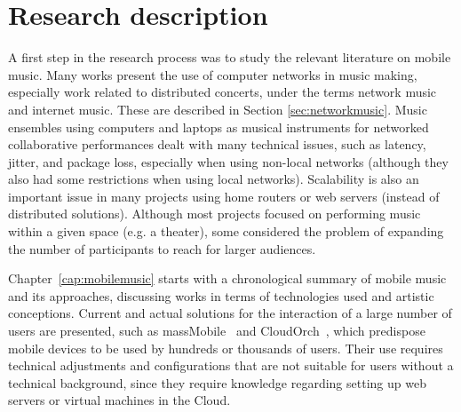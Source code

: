 \section{Research description}

A first step in the research process was to study the relevant literature on mobile music.
Many works present the use of computer networks in music making, especially work related to distributed concerts, under the terms network music and internet music.
These are described in Section \ref{sec:networkmusic}.
Music ensembles using computers and laptops as musical instruments for networked collaborative performances dealt with many technical issues, such as latency, jitter, and package loss, especially when using non-local networks (although they also had some restrictions when using local networks).
Scalability is also an important issue in many projects using home routers or web servers (instead of distributed solutions).
Although most projects focused on performing music within a given space (e.g. a theater), some considered the problem of expanding the number of participants to reach for larger audiences.

Chapter~\ref{cap:mobilemusic} starts with a chronological summary of mobile music and its approaches, discussing
works in terms of technologies used and artistic conceptions.
Current and actual solutions for the interaction of a large number of users are presented, such as massMobile~\citep{Weitzner2012massmobile} and CloudOrch~\citep{Hindle2014cloudorch}, which predispose mobile devices to be used by hundreds or thousands of users.
Their use requires technical adjustments and configurations that are not suitable for users without a technical background, since they require knowledge regarding setting up web servers or virtual machines in the Cloud.

